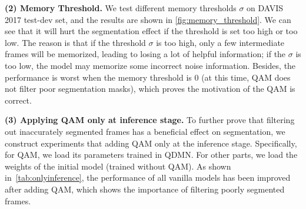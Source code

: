 \documentclass[runningheads]{llncs}
\begin{document}
    
    
    \textbf{(2) Memory Threshold.} We test different memory thresholds $\sigma$ on DAVIS 2017 test-dev set, and the results are shown in \cref{fig:memory_threshold}. 
    We can see that it will hurt the segmentation effect if the threshold is set too high or too low.
    The reason is that if the threshold $\sigma$ is too high, only a few intermediate frames will be memorized, leading to losing a lot of helpful information; if the $\sigma$ is too low, the model may memorize some incorrect noise information.
    Besides, the performance is worst when the memory threshold is 0 (at this time, QAM does not filter poor segmentation masks), which proves the motivation of the QAM is correct. 
    


    \textbf{(3) Applying QAM only at inference stage.}
    To further prove that filtering out inaccurately segmented frames has a beneficial effect on segmentation, 
    we construct experiments that adding QAM only at the inference stage. 
    Specifically, for QAM, we load its parameters trained in QDMN.
    For other parts, we load the weights of the initial model (trained without QAM).
    As shown in~\cref{tab:onlyinference}, the performance of all vanilla models has been improved after adding QAM, which shows the importance of filtering poorly segmented frames.\\
    
\end{document}
